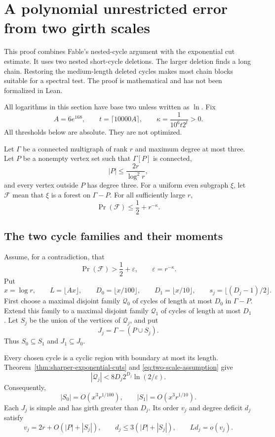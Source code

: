 \section{A polynomial unrestricted error from two girth scales}
\label{sec:two-scale-polynomial-error}

This proof combines Fable's nested-cycle argument with the exponential cut estimate.
It uses two nested short-cycle deletions.
The larger deletion finds a long chain.
Restoring the medium-length deleted cycles makes most chain blocks suitable for a spectral test.
The proof is mathematical and has not been formalized in Lean.

All logarithms in this section have base two unless written as $\ln$.
Fix
\[
 A=6e^{168},\qquad t=\lceil10000A\rceil,
 \qquad \kappa=\frac1{10^6t2^t}>0.
\]
All thresholds below are absolute.
They are not optimized.

\begin{theorem}
\label{thm:two-scale-polynomial-forest}
Let $\Gamma$ be a connected multigraph of rank $r$ and maximum degree at most three.
Let $P$ be a nonempty vertex set such that $\Gamma[P]$ is connected,
\[
 |P|\le\frac{2r}{\log^2r},
\]
and every vertex outside $P$ has degree three.
For a uniform even subgraph $\xi$, let $\mathcal F$ mean that $\xi$ is a forest on $\Gamma-P$.
For all sufficiently large $r$,
\[
 \Pr(\mathcal F)\le\frac12+r^{-\kappa}.
\]
\end{theorem}

\subsection{The two cycle families and their moments}

Assume, for a contradiction, that
\begin{equation}\label{eq:two-scale-assumption}
 \Pr(\mathcal F)>\frac12+\varepsilon,
 \qquad \varepsilon=r^{-\kappa}.
\end{equation}
Put
\[
 x=\log r,\qquad L=\lfloor Ax\rfloor,
 \qquad D_0=\lfloor x/100\rfloor,
 \qquad D_1=\lfloor x/10\rfloor,
 \qquad s_j=\lfloor(D_j-1)/2\rfloor.
\]
First choose a maximal disjoint family $\mathcal Q_0$ of cycles of length at most $D_0$ in $\Gamma-P$.
Extend this family to a maximal disjoint family $\mathcal Q_1$ of cycles of length at most $D_1$.
Let $S_j$ be the union of the vertices of $\mathcal Q_j$, and put
\[
 J_j=\Gamma-(P\cup S_j).
\]
Thus $S_0\subseteq S_1$ and $J_1\subseteq J_0$.

Every chosen cycle is a cyclic region with boundary at most its length.
Theorem~\ref{thm:sharper-exponential-cuts} and \eqref{eq:two-scale-assumption} give
\[
 |\mathcal Q_j|<8D_j2^{D_j}\ln(2/\varepsilon).
\]
Consequently,
\begin{equation}\label{eq:two-scale-deletion-sizes}
 |S_0|=O(x^3r^{1/100}),\qquad
 |S_1|=O(x^3r^{1/10}).
\end{equation}
Each $J_j$ is simple and has girth greater than $D_j$.
Its order $v_j$ and degree deficit $d_j$ satisfy
\[
 v_j=2r+O(|P|+|S_j|),\qquad
 d_j\le3(|P|+|S_j|),\qquad Ld_j=o(v_j).
\]

